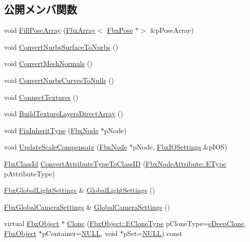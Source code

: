 \subsection*{公開メンバ関数}
\begin{DoxyCompactItemize}
\item 
void \hyperlink{class_fbx_scene_a78c7b7beb811f9c91d98e2dec5eccedc}{Fill\+Pose\+Array} (\hyperlink{class_fbx_array}{Fbx\+Array}$<$ \hyperlink{class_fbx_pose}{Fbx\+Pose} $\ast$$>$ \&p\+Pose\+Array)
\item 
void \hyperlink{class_fbx_scene_abf1c255ce53d570ce7038154c6194f1a}{Convert\+Nurbs\+Surface\+To\+Nurbs} ()
\item 
void \hyperlink{class_fbx_scene_a945048409176af7ce52ecb017cfb69ec}{Convert\+Mesh\+Normals} ()
\item 
void \hyperlink{class_fbx_scene_a9d1fed2b6c643ff2a091928ff8b8b634}{Convert\+Nurbs\+Curves\+To\+Nulls} ()
\item 
void \hyperlink{class_fbx_scene_aeb20ccb008b9d646c00b78780b4b6c16}{Connect\+Textures} ()
\item 
void \hyperlink{class_fbx_scene_a27a6d24089178bc992f59787aef9d319}{Build\+Texture\+Layers\+Direct\+Array} ()
\item 
void \hyperlink{class_fbx_scene_acf98b8d5cee48e3e2301d25814378945}{Fix\+Inherit\+Type} (\hyperlink{class_fbx_node}{Fbx\+Node} $\ast$p\+Node)
\item 
void \hyperlink{class_fbx_scene_a68b89374967020ed469645de47eb4507}{Update\+Scale\+Compensate} (\hyperlink{class_fbx_node}{Fbx\+Node} $\ast$p\+Node, \hyperlink{class_fbx_i_o_settings}{Fbx\+I\+O\+Settings} \&p\+I\+OS)
\item 
\hyperlink{class_fbx_class_id}{Fbx\+Class\+Id} \hyperlink{class_fbx_scene_aca61130d681d641f172117b8ae3e89a0}{Convert\+Attribute\+Type\+To\+Class\+ID} (\hyperlink{class_fbx_node_attribute_a08e1669d3d1a696910756ab17de56d6a}{Fbx\+Node\+Attribute\+::\+E\+Type} p\+Attribute\+Type)
\item 
\hyperlink{class_fbx_global_light_settings}{Fbx\+Global\+Light\+Settings} \& \hyperlink{class_fbx_scene_a0583b181b70f56655f06dbe79b43fcd6}{Global\+Light\+Settings} ()
\item 
\hyperlink{class_fbx_global_camera_settings}{Fbx\+Global\+Camera\+Settings} \& \hyperlink{class_fbx_scene_a029b34d23edd7d05cb0e687b494064ad}{Global\+Camera\+Settings} ()
\item 
virtual \hyperlink{class_fbx_object}{Fbx\+Object} $\ast$ \hyperlink{class_fbx_scene_acee728f921bf4e25f6f8accf3446b079}{Clone} (\hyperlink{class_fbx_object_a9f5626b2d2135684d6ea1e6e4ad2acbb}{Fbx\+Object\+::\+E\+Clone\+Type} p\+Clone\+Type=\hyperlink{class_fbx_object_a9f5626b2d2135684d6ea1e6e4ad2acbbaacdf137ca059c572798287e98c4236d0}{e\+Deep\+Clone}, \hyperlink{class_fbx_object}{Fbx\+Object} $\ast$p\+Container=\hyperlink{fbxarch_8h_a070d2ce7b6bb7e5c05602aa8c308d0c4}{N\+U\+LL}, void $\ast$p\+Set=\hyperlink{fbxarch_8h_a070d2ce7b6bb7e5c05602aa8c308d0c4}{N\+U\+LL}) const
$$
\end{DoxyCompactItemize}
